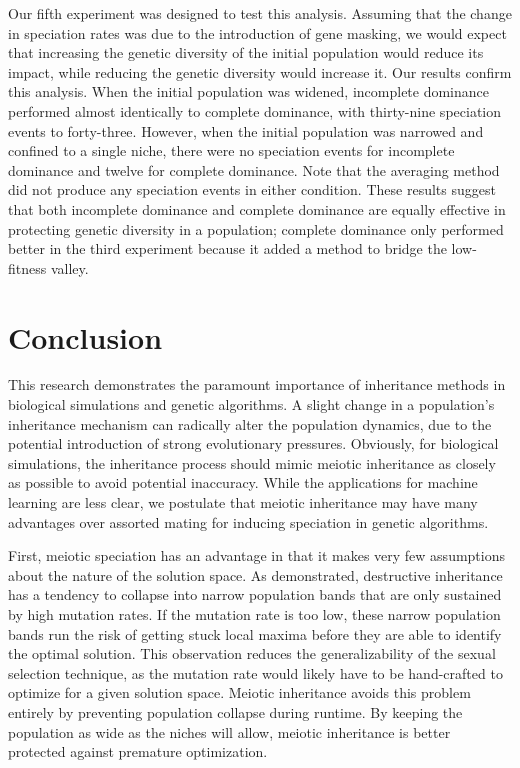 \documentclass{article}
\begin{document}
Our fifth experiment was designed to test this analysis. Assuming that the change in speciation rates was due to the introduction of gene masking, we would expect that increasing the genetic diversity of the initial population would reduce its impact, while reducing the genetic diversity would increase it. Our results confirm this analysis. When the initial population was widened, incomplete dominance performed almost identically to complete dominance, with thirty-nine speciation events to forty-three. However, when the initial population was narrowed and confined to a single niche, there were no speciation events for incomplete dominance and twelve for complete dominance. Note that the averaging method did not produce any speciation events in either condition. These results suggest that both incomplete dominance and complete dominance are equally effective in protecting genetic diversity in a population; complete dominance only performed better in the third experiment because it added a method to bridge the low-fitness valley.



\section{Conclusion}

This research demonstrates the paramount importance of inheritance methods in biological simulations and genetic algorithms. A slight change in a population’s inheritance mechanism can radically alter the population dynamics, due to the potential introduction of strong evolutionary pressures. Obviously, for biological simulations, the inheritance process should mimic meiotic inheritance as closely as possible to avoid potential inaccuracy. While the applications for machine learning are less clear, we postulate that meiotic inheritance may have many advantages over assorted mating for inducing speciation in genetic algorithms.

First, meiotic speciation has an advantage in that it makes very few assumptions about the nature of the solution space. As demonstrated, destructive inheritance has a tendency to collapse into narrow population bands that are only sustained by high mutation rates. If the mutation rate is too low, these narrow population bands run the risk of getting stuck local maxima before they are able to identify the optimal solution. This observation reduces the generalizability of the sexual selection technique, as the mutation rate would likely have to be hand-crafted to optimize for a given solution space. Meiotic inheritance avoids this problem entirely by preventing population collapse during runtime. By keeping the population as wide as the niches will allow, meiotic inheritance is better protected against premature optimization.
\end{document}
